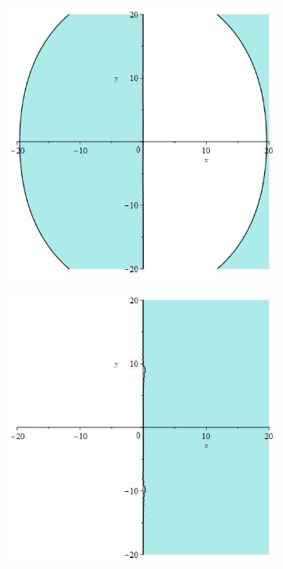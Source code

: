 \documentclass[12pt]{article}
\begin{document}
\begin{figure}[H]
\begin{subfigure}{0.24\textwidth}
    \end{subfigure}
     \begin{subfigure}{0.24\textwidth}
        \includegraphics[width=0.9\linewidth]{stabrks3_105i.jpg}
    \end{subfigure}
    \begin{subfigure}{0.24\textwidth}
        \includegraphics[width=0.9\linewidth]{stabrks3_11i.jpg}

\end{subfigure}
\end{figure}
\end{document}
